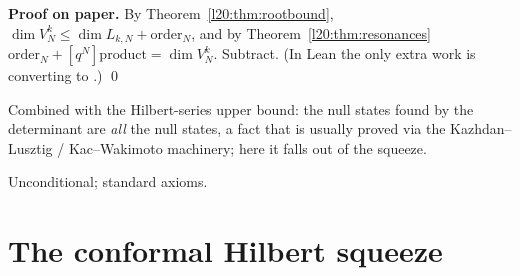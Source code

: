 \textbf{Proof on paper.} By Theorem~\ref{l20:thm:rootbound},
$\dim V^k_N\le\dim L_{k,N}+\mathrm{order}_N$, and by Theorem~\ref{l20:thm:resonances}
$\mathrm{order}_N+[q^N]\mathrm{product}=\dim V^k_N$. Subtract. (In Lean the only extra work is converting
 to .) \qed

\begin{physics}
Combined with the Hilbert-series upper bound: the null states found by the determinant are \emph{all} the null states, a fact that is usually
proved via the Kazhdan--Lusztig / Kac--Wakimoto machinery; here it falls out of the squeeze.
\end{physics}

\begin{status}
Unconditional; standard axioms.
\end{status}

\section{The conformal Hilbert squeeze}\label{l20:sec:m7}

